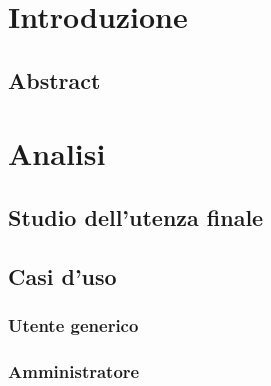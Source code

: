 \documentclass[a4paper, oneside, openany, dvipsnames, table]{article}
\begin{document}
\copertina
\tableofcontents
\newpage
\section{Introduzione}
	
	\subsection{Abstract}
		
	
\newpage
\section{Analisi}
	
	\subsection{Studio dell'utenza finale}
		
	\subsection{Casi d'uso}
		
		\subsubsection{Utente generico}
			
		\subsubsection{Amministratore}
			

\newpage
\end{document}
